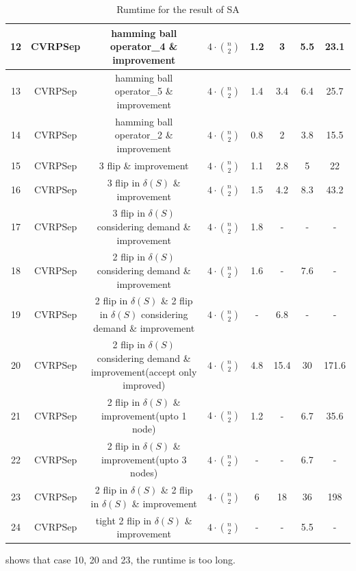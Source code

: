 \documentclass[11pt]{article}
\begin{document}
\begin{spacing}{1.5}
\begin{table}[!htb]
{\begin{tabular}{|c|c|c|c|c|c|c|c|}
12 & CVRPSep          & hamming ball operator\_4 \& improvement                & $4\cdot \binom n2$   &1.2  &3  &5.5  &23.1    \\ \hline
13 & CVRPSep          & hamming ball operator\_5 \& improvement                & $4\cdot \binom n2$   &1.4  &3.4  &6.4   &25.7   \\ \hline
14 & CVRPSep          & hamming ball operator\_2 \& improvement                & $4\cdot \binom n2$   &0.8  &2  &3.8   &15.5    \\ \hline
15 & CVRPSep          & 3 flip \& improvement                            & $4\cdot \binom n2$   &1.1  &2.8  &5   &22   \\ \hline
16 & CVRPSep          & 3 flip in $\delta(S)$ \& improvement               & $4\cdot \binom n2$   &1.5  &4.2  &8.3   &43.2   \\ \hline
17 & CVRPSep          & 3 flip in $\delta(S)$ considering demand \& improvement & $4\cdot \binom n2$  &1.8  &- &-   &-   \\ \hline
18 & CVRPSep          & 2 flip in $\delta(S)$ considering demand \& improvement & $4\cdot \binom n2$   &1.6  &- &7.6   &-   \\ \hline
19 & CVRPSep & 2 flip in $\delta(S)$ \& 2 flip in $\delta(S)$ considering demand \& improvement & $4\cdot \binom n2$   &-  &6.8 &-   &-   \\ \hline
20 & CVRPSep & 2 flip in $\delta(S)$ considering demand \& improvement(accept only improved)                         & $4\cdot \binom n2$ &4.8 &15.4 &30 &171.6   \\ \hline
21 & CVRPSep          & 2 flip in $\delta(S)$ \& improvement(upto 1 node)       & $4\cdot \binom n2$  &1.2  &-  &6.7   &35.6    \\ \hline
22 & CVRPSep          & 2 flip in $\delta(S)$ \& improvement(upto 3 nodes)       & $4\cdot \binom n2$  &-  &-  &6.7   &-    \\ \hline
23 & CVRPSep & 2 flip in $\delta(S)$ \& 2 flip in $\delta(S)$ \& improvement               & $4\cdot \binom n2$  &6  &18  &36   &198    \\ \hline
24 & CVRPSep          & tight 2 flip in $\delta(S)$ \& improvement       & $4\cdot \binom n2$  &-  &-  &5.5   &-   \\ \hline
\end{tabular}%
}
\caption{Rumtime for the result of SA}
\end{table}

\noindent [Table 3] shows that case 10, 20 and 23, the runtime is too long.


\end{spacing}
\end{document}
